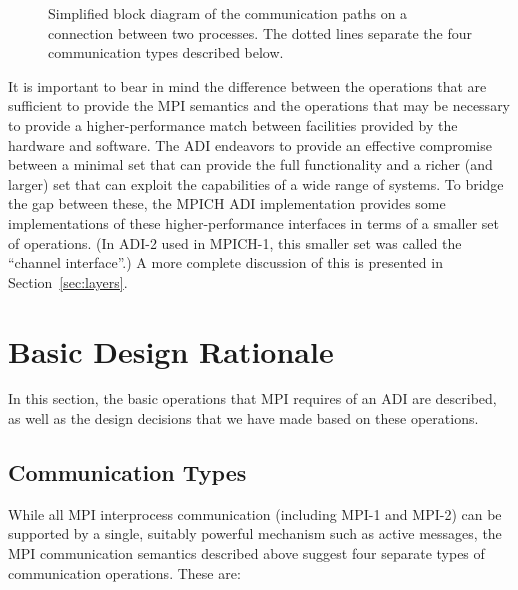 \documentclass{article}
\begin{document}
\begin{figure}
\centerline{}
\caption{Simplified block diagram of the communication paths on a connection
  between two processes.  The dotted lines separate the four communication
  types described below.} 
\label{fig:adi-overview}
\end{figure}

It is important to bear in mind the difference between the operations that are
sufficient to provide the MPI semantics and the operations that may be
necessary to provide a higher-performance match between facilities
provided by the hardware and software.  The ADI endeavors to provide
an effective compromise between a minimal set that can provide the
full functionality and a richer (and larger) set that can exploit the
capabilities of a wide range of systems.  To bridge the gap between
these, the MPICH ADI implementation provides some implementations of
these higher-performance interfaces in terms of a smaller set of
operations.  (In ADI-2 used in MPICH-1, this smaller set was called
the ``channel interface''.)  A more complete discussion of this is
presented in Section~\ref{sec:layers}.

\section{Basic Design Rationale}
\label{sec:basic-design}
In this section, the basic operations that MPI requires of an ADI are
described, as well as the design decisions that we have made based on these
operations.

\subsection{Communication Types}
\label{sec:comm-types}

While all MPI interprocess communication (including MPI-1 and MPI-2)
can be supported by a single, suitably powerful mechanism such as
active messages, the MPI communication semantics described above
suggest four separate types of communication operations.  These are:
\end{document}

